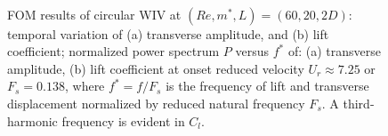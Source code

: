 \begin{figure}
\centering
\begin{subfigure}{0.495\textwidth}
\centering
    \caption{}
    \label{fig:yy}
    \end{subfigure} \\
\begin{subfigure}{0.495\textwidth}
\centering
    \caption{}
    \label{fig:cl}
    \end{subfigure} 
  \caption{FOM results of circular WIV at $(Re,m^*,L)=(60,20,2D)$:
        temporal variation of 
        (a) transverse amplitude, and (b) lift coefficient; 
        normalized power spectrum $P$ versus $f^*$ of: 
        (a) transverse amplitude, (b) lift coefficient at onset reduced velocity $U_r \approx 7.25$ or $F_s=0.138$, where  $f^*=f/F_s$ 
        is the frequency of lift and transverse displacement normalized 
        by reduced natural frequency $F_s$. 
        A third-harmonic frequency is evident in $C_l$.}
\label{fig:m20_fom}  
\end{figure}


